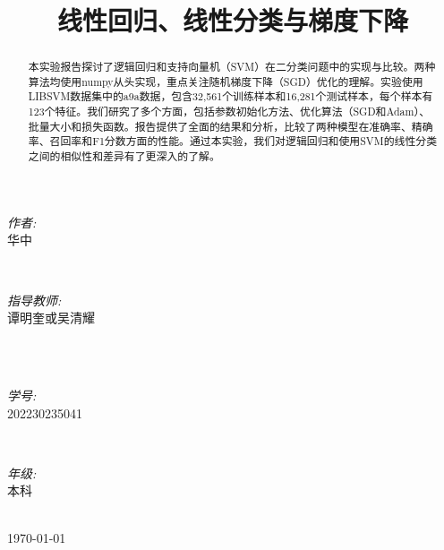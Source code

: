 \documentclass[journal, a4paper]{IEEEtran}
\begin{document}
\begin{CJK}{UTF8}{gbsn}
\begin{titlepage}
\begin{minipage}{0.4\textwidth}
\begin{flushleft} \large
\emph{作者:}\\
华中 %
\end{flushleft}
\end{minipage}
~
\begin{minipage}{0.4\textwidth}
\begin{flushright} \large
\emph{指导教师:} \\
谭明奎或吴清耀 %
\end{flushright}
\end{minipage}\\[2cm]
~
\begin{minipage}{0.4\textwidth}
\begin{flushleft} \large
\emph{学号:}\\
202230235041
\end{flushleft}
\end{minipage}
~
\begin{minipage}{0.4\textwidth}
\begin{flushright} \large
\emph{年级:} \\
本科
\end{flushright}
\end{minipage}\\[2cm]


{\large \today}\\[2cm] %


\vfill %

\end{titlepage}

\title{线性回归、线性分类与梯度下降}
\maketitle

\begin{abstract}
本实验报告探讨了逻辑回归和支持向量机（SVM）在二分类问题中的实现与比较。两种算法均使用numpy从头实现，重点关注随机梯度下降（SGD）优化的理解。实验使用LIBSVM数据集中的a9a数据，包含32,561个训练样本和16,281个测试样本，每个样本有123个特征。我们研究了多个方面，包括参数初始化方法、优化算法（SGD和Adam）、批量大小和损失函数。报告提供了全面的结果和分析，比较了两种模型在准确率、精确率、召回率和F1分数方面的性能。通过本实验，我们对逻辑回归和使用SVM的线性分类之间的相似性和差异有了更深入的了解。
\end{abstract}


\end{CJK}
\end{document}
